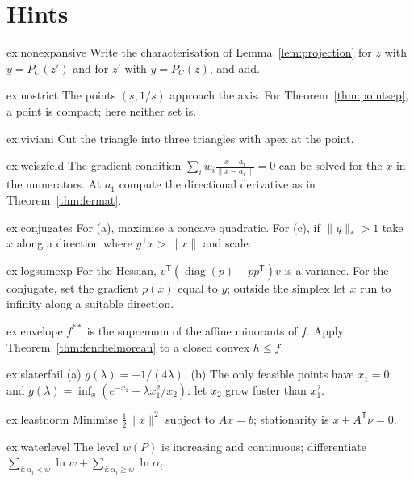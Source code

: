 \section{Hints}

\begin{hint}{ex:nonexpansive}
Write the characterisation of Lemma~\ref{lem:projection} for $z$ with $y=P_C(z')$ and for $z'$ with $y=P_C(z)$, and add.
\end{hint}
\begin{hint}{ex:nostrict}
The points $(s,1/s)$ approach the axis. For Theorem~\ref{thm:pointsep}, a point is compact; here neither set is.
\end{hint}
\begin{hint}{ex:viviani}
Cut the triangle into three triangles with apex at the point.
\end{hint}
\begin{hint}{ex:weiszfeld}
The gradient condition $\sum_iw_i\frac{x-a_i}{\|x-a_i\|}=0$ can be solved for the $x$ in the numerators. At $a_1$ compute the directional derivative as in Theorem~\ref{thm:fermat}.
\end{hint}
\begin{hint}{ex:conjugates}
For (a), maximise a concave quadratic. For (c), if $\|y\|_*>1$ take $x$ along a direction where $y^{\mathsf T}x>\|x\|$ and scale.
\end{hint}
\begin{hint}{ex:logsumexp}
For the Hessian, $v^{\mathsf T}(\operatorname{diag}(p)-pp^{\mathsf T})v$ is a variance. For the conjugate, set the gradient $p(x)$ equal to $y$; outside the simplex let $x$ run to infinity along a suitable
direction.
\end{hint}
\begin{hint}{ex:envelope}
$f^{**}$ is the supremum of the affine minorants of $f$. Apply Theorem~\ref{thm:fenchelmoreau} to a closed convex $h\le f$.
\end{hint}
\begin{hint}{ex:slaterfail}
(a) $g(\lambda)=-1/(4\lambda)$. (b) The only feasible points have $x_1=0$; and $g(\lambda)=\inf_x(e^{-x_1}+\lambda x_1^2/x_2)$: let $x_2$ grow faster than $x_1^2$.
\end{hint}
\begin{hint}{ex:leastnorm}
Minimise $\frac12\|x\|^2$ subject to $Ax=b$; stationarity is $x+A^{\mathsf T}\nu=0$.
\end{hint}
\begin{hint}{ex:waterlevel}
The level $w(P)$ is increasing and continuous; differentiate $\sum_{i:\alpha_i<w}\ln w+\sum_{i:\alpha_i\ge w}\ln\alpha_i$.
\end{hint}
